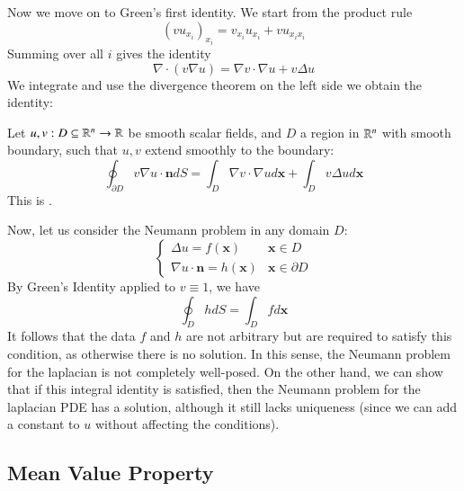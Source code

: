 Now we move on to Green's first identity. We start from the product rule \begin{equation*}
    (vu_{x_i})_{x_i} = v_{x_i}u_{x_i}+vu_{x_ix_i}
\end{equation*}
Summing over all $i$ gives the identity \begin{equation*}
    \nabla \cdot (v\nabla u) = \nabla v\cdot \nabla u + v\Delta u
\end{equation*}
We integrate and use the divergence theorem on the left side we obtain the identity:
\begin{definition}
    Let $u,v:D\subseteq \mathbb R^n\rightarrow \mathbb R$ be smooth scalar fields, and $D$ a region in $\mathbb R^n$ with smooth boundary, such that $u,v$ extend smoothly to the boundary:
    \begin{equation}
        \boxed{\oint_{\partial D}v\nabla u\cdot \mathbf{n}dS = \int_D\nabla v\cdot \nabla ud\mathbf{x}+\int_Dv\Delta ud\mathbf{x}}
    \end{equation}
    This is .
\end{definition}

Now, let us consider the Neumann problem in any domain $D$: \begin{equation*}
    \left\{\begin{array}{lc} \Delta u = f(\mathbf{x})& \mathbf{x} \in D \\ \nabla u \cdot \mathbf{n} = h(\mathbf{x}) & \mathbf{x} \in \partial D\end{array}\right.
\end{equation*}
By Green's Identity applied to $v \equiv 1$, we have \begin{equation*}
    \oint_DhdS = \int_Dfd\mathbf{x}
\end{equation*}
It follows that the data $f$ and $h$ are not arbitrary but are required to satisfy this condition, as otherwise there is no solution. In this sense, the Neumann problem for the laplacian is not completely well-posed. On the other hand, we can show that if this integral identity is satisfied, then the Neumann problem for the laplacian PDE has a solution, although it still lacks uniqueness (since we can add a constant to $u$ without affecting the conditions).

\subsection{Mean Value Property}

